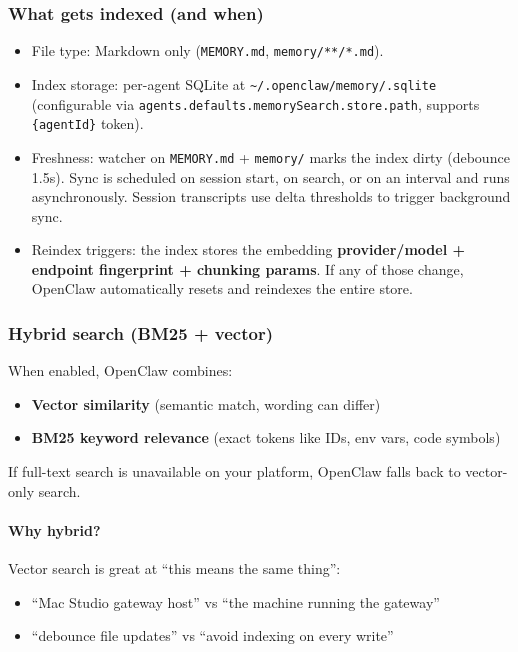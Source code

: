 \subsubsection{What gets indexed (and when)}


\begin{itemize}
  \item File type: Markdown only (\texttt{MEMORY.md}, \texttt{memory/**/*.md}).
  \item Index storage: per-agent SQLite at \texttt{\textasciitilde{}/.openclaw/memory/.sqlite} (configurable via \texttt{agents.defaults.memorySearch.store.path}, supports \texttt{\{agentId\}} token).
  \item Freshness: watcher on \texttt{MEMORY.md} + \texttt{memory/} marks the index dirty (debounce 1.5s). Sync is scheduled on session start, on search, or on an interval and runs asynchronously. Session transcripts use delta thresholds to trigger background sync.
  \item Reindex triggers: the index stores the embedding \textbf{provider/model + endpoint fingerprint + chunking params}. If any of those change, OpenClaw automatically resets and reindexes the entire store.
\end{itemize}


\subsubsection{Hybrid search (BM25 + vector)}


When enabled, OpenClaw combines:

\begin{itemize}
  \item \textbf{Vector similarity} (semantic match, wording can differ)
  \item \textbf{BM25 keyword relevance} (exact tokens like IDs, env vars, code symbols)
\end{itemize}


If full-text search is unavailable on your platform, OpenClaw falls back to vector-only search.

\paragraph{Why hybrid?}


Vector search is great at “this means the same thing”:

\begin{itemize}
  \item “Mac Studio gateway host” vs “the machine running the gateway”
  \item “debounce file updates” vs “avoid indexing on every write”
\end{itemize}



